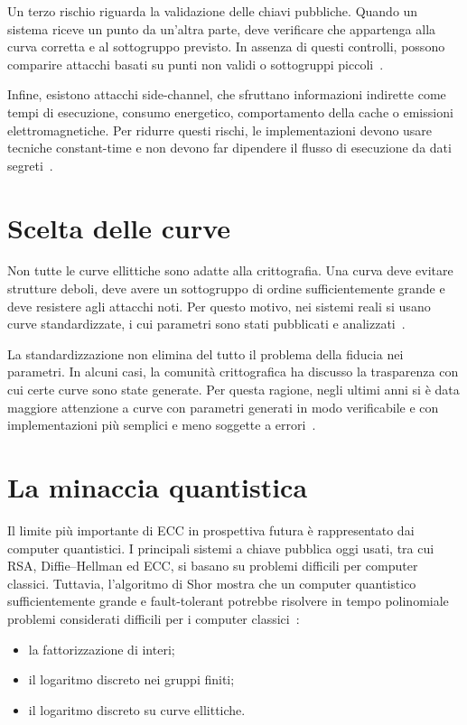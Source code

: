 \documentclass[12pt,a4paper,oneside]{report}
\begin{document}
Un terzo rischio riguarda la validazione delle chiavi pubbliche. Quando un sistema riceve un punto da un'altra parte, deve verificare che appartenga alla curva corretta e al sottogruppo previsto. In assenza di questi controlli, possono comparire attacchi basati su punti non validi o sottogruppi piccoli~\cite{sec1}.

Infine, esistono attacchi side-channel, che sfruttano informazioni indirette come tempi di esecuzione, consumo energetico, comportamento della cache o emissioni elettromagnetiche. Per ridurre questi rischi, le implementazioni devono usare tecniche constant-time e non devono far dipendere il flusso di esecuzione da dati segreti~\cite{sec1}.

\section{Scelta delle curve}

Non tutte le curve ellittiche sono adatte alla crittografia. Una curva deve evitare strutture deboli, deve avere un sottogruppo di ordine sufficientemente grande e deve resistere agli attacchi noti. Per questo motivo, nei sistemi reali si usano curve standardizzate, i cui parametri sono stati pubblicati e analizzati~\cite{sec1}.

La standardizzazione non elimina del tutto il problema della fiducia nei parametri. In alcuni casi, la comunità crittografica ha discusso la trasparenza con cui certe curve sono state generate. Per questa ragione, negli ultimi anni si è data maggiore attenzione a curve con parametri generati in modo verificabile e con implementazioni più semplici e meno soggette a errori~\cite{sec1}.

\section{La minaccia quantistica}

Il limite più importante di ECC in prospettiva futura è rappresentato dai computer quantistici. I principali sistemi a chiave pubblica oggi usati, tra cui RSA, Diffie--Hellman ed ECC, si basano su problemi difficili per computer classici. Tuttavia, l'algoritmo di Shor mostra che un computer quantistico sufficientemente grande e fault-tolerant potrebbe risolvere in tempo polinomiale problemi considerati difficili per i computer classici~\cite{margara_pqc}:

\begin{itemize}
    \item la fattorizzazione di interi;
    \item il logaritmo discreto nei gruppi finiti;
    \item il logaritmo discreto su curve ellittiche.
\end{itemize}
\end{document}
